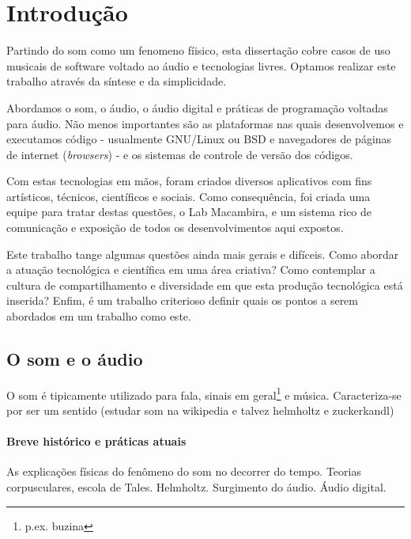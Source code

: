 \chapter{Introdução} %
\label{cap:intro} %
Partindo do som como um fenomeno fíisico, esta dissertação 
cobre casos de uso musicais de software voltado ao áudio e tecnologias livres. Optamos
realizar este trabalho através da síntese e da simplicidade. 

Abordamos o som, o áudio, o áudio digital e práticas de programação voltadas para
áudio. Não menos importantes são as plataformas nas quais desenvolvemos e executamos código
- usualmente GNU/Linux ou BSD e navegadores de páginas de internet (\emph{browsers}) - e
os sistemas de controle de versão dos códigos.

Com estas tecnologias em mãos, foram criados diversos aplicativos com fins artísticos,
técnicos, científicos e sociais. Como consequência, foi criada uma equipe para tratar
destas questões, o Lab Macambira, e um sistema rico de comunicação e exposição de todos
os desenvolvimentos aqui expostos.

Este trabalho tange algumas questões ainda mais gerais e difíceis.
Como abordar a atuação tecnológica e científica em uma área criativa? Como contemplar
a cultura de compartilhamento e diversidade em que esta produção tecnológica está inserida?
Enfim, é um trabalho criterioso definir quais os pontos a serem abordados em
um trabalho como este.


  \section{O som e o áudio}
  O som é tipicamente utilizado para fala, sinais em geral\footnote{p.ex. buzina} e música.
  Caracteriza-se por ser um sentido (estudar som na wikipedia e talvez helmholtz e zuckerkandl)


	  \subsubsection{Breve histórico e práticas atuais}
	As explicações físicas do fenômeno do som no decorrer do tempo. Teorias
	corpusculares, escola de Tales. Helmholtz. Surgimento do áudio. Áudio digital.


